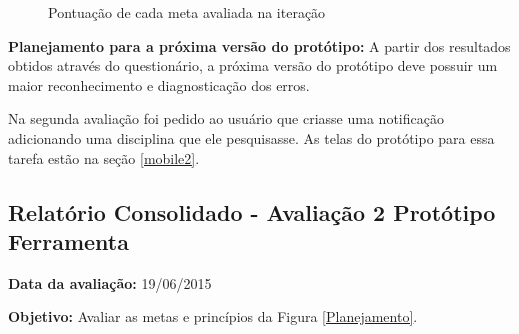   \begin{figure}[h!]
  \centering
    \caption{Pontuação de cada meta avaliada na iteração}
    \label{fig:grafico1}
\end{figure}

  \textbf{Planejamento para a próxima versão do protótipo:}
  A partir dos resultados obtidos através do questionário, a próxima versão do protótipo deve possuir um maior reconhecimento e diagnosticação
  dos erros.

  \vfill
  \pagebreak

  Na segunda avaliação foi pedido ao usuário que criasse uma notificação adicionando uma disciplina que ele pesquisasse. As telas do protótipo para essa tarefa
estão na seção \ref{mobile2}.

  \subsection{Relatório Consolidado - Avaliação 2 Protótipo Ferramenta}

  \flushleft \textbf{Data da avaliação:} 
  19/06/2015

  \textbf{Objetivo:}
  Avaliar as metas e princípios da Figura \ref{Planejamento}.


